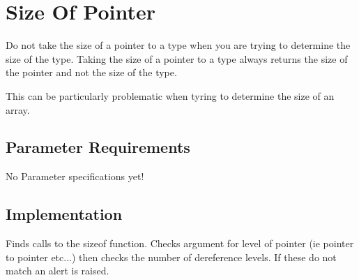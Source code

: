 %
%

\section{Size Of Pointer}
\label{SizeOfPointer::overview}

Do not take the size of a pointer to a type when you are trying to
determine the size of the type. Taking the size of a pointer to a type
always returns the size of the pointer and not the size of the type.

This can be particularly problematic when tyring to determine the size
of an array.

\subsection{Parameter Requirements}

   No Parameter specifications yet!

\subsection{Implementation}


   Finds calls to the sizeof function.  Checks argument for level of
pointer (ie pointer to pointer etc...) then checks the number of
dereference levels.  If these do not match an alert is raised.


